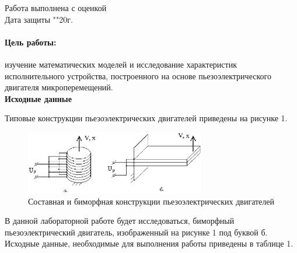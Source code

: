 \documentclass[12pt, a4paper]{article}
\begin{document}
\begin{titlepage}
		Работа выполнена с оценкой \hspace{1cm} \underline{\hspace{8cm}} \\ 
		\vspace{1cm}
		Дата защиты "\underline{\hspace{0.7cm}}"\hspace{0.2cm}\underline{\hspace{2cm}}\hspace{0.2cm}20\underline{\hspace{0.7cm}}г.

	\end{titlepage}

\paragraph {Цель работы:} изучение математических моделей и исследование характеристик исполнительного устройства, построенного на 
основе пьезоэлектрического двигателя микроперемещений.\\
\textbf{Исходные данные}
\par Типовые конструкции пьезоэлектрических двигателей приведены на рисунке 1.
\begin{figure}[H]
\centering
\includegraphics[width=0.7\textwidth]{1/str.eps}
\caption{Составная и биморфная конструкции пьезоэлектрических двигателей}
\end{figure}
В данной лабораторной работе будет исследоваться, биморфный пьезоэлектрический двигатель, изображенный на рисунке 1 под буквой б.
Исходные данные, необходимые для выполнения работы приведены в таблице 1.
\end{document}

